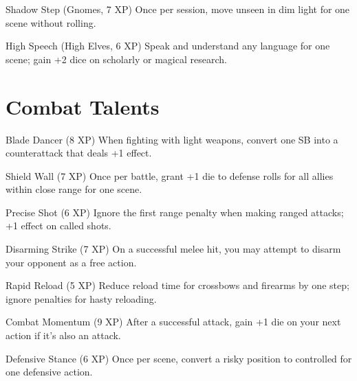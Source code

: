 \documentclass[11pt]{article}
\begin{document}
\begin{talentbox}{Shadow Step (Gnomes, 7 XP)}
Once per session, move unseen in dim light for one scene without rolling.
\end{talentbox}

\begin{talentbox}{High Speech (High Elves, 6 XP)}
Speak and understand any language for one scene; gain +2 dice on scholarly or magical research.
\end{talentbox}

\section*{Combat Talents}

\begin{talentbox}{Blade Dancer (8 XP)}
When fighting with light weapons, convert one SB into a counterattack that deals +1 effect.
\end{talentbox}

\begin{talentbox}{Shield Wall (7 XP)}
Once per battle, grant +1 die to defense rolls for all allies within close range for one scene.
\end{talentbox}

\begin{talentbox}{Precise Shot (6 XP)}
Ignore the first range penalty when making ranged attacks; +1 effect on called shots.
\end{talentbox}

\begin{talentbox}{Disarming Strike (7 XP)}
On a successful melee hit, you may attempt to disarm your opponent as a free action.
\end{talentbox}

\begin{talentbox}{Rapid Reload (5 XP)}
Reduce reload time for crossbows and firearms by one step; ignore penalties for hasty reloading.
\end{talentbox}

\begin{talentbox}{Combat Momentum (9 XP)}
After a successful attack, gain +1 die on your next action if it's also an attack.
\end{talentbox}

\begin{talentbox}{Defensive Stance (6 XP)}
Once per scene, convert a risky position to controlled for one defensive action.
\end{talentbox}
\end{document}
